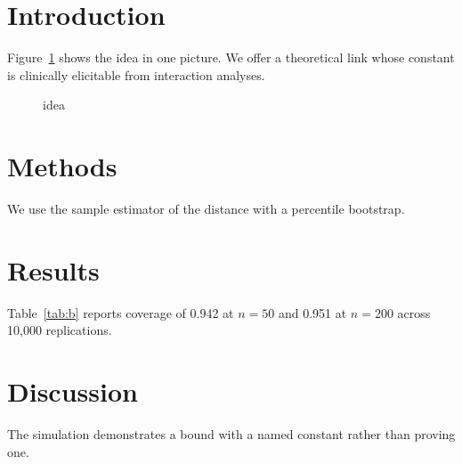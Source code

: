 \documentclass{article}
\begin{document}
\section{Introduction}\label{sec:intro}
Figure~\ref{fig:a} shows the idea in one picture. We offer a theoretical link whose constant is clinically elicitable from interaction analyses.
\begin{figure}\caption{idea\label{fig:a}}\end{figure}
\section{Methods}\label{sec:methods}
We use the sample estimator of the distance with a percentile bootstrap. %
\section{Results}\label{sec:results}
Table~\ref{tab:b} reports coverage of 0.942 at $n=50$ and 0.951 at $n=200$ across 10,000 replications.
\begin{table}\caption{coverage\label{tab:b}}\end{table}
\section{Discussion}\label{sec:discussion}
The simulation demonstrates a bound with a named constant rather than proving one.
\end{document}

